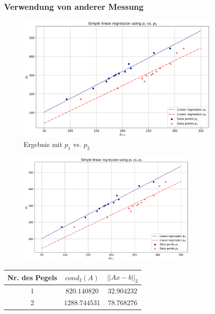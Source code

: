 \documentclass{beamer}
\begin{document}
\begin{frame} %
  \frametitle{Verwendung von anderer Messung} %
  \begin{figure}
    \centering
      \includegraphics[width=0.9\textwidth]{Linear_Regression_p2}
      \vspace{-1em}
    \caption{Ergebnis mit $p_1$ vs. $p_2$}
  \end{figure}
\end{frame}
\begin{frame}
  \begin{figure}
    \centering
      \includegraphics[width=0.8\textwidth]{Linear_Regression_p2}
  \end{figure}
  \vspace{-1em}
  \centering
  \begin{tabular}{c|c|c}
    Nr. des Pegels & $cond_2(A)$   & $||Ax-b||_2$\\ \hline
                 1 & $820.140820$  & $32.904232$\\ \hline
                 2 & $1288.744531$ & $78.768276$
  \end{tabular}
\end{frame}
\end{document}
